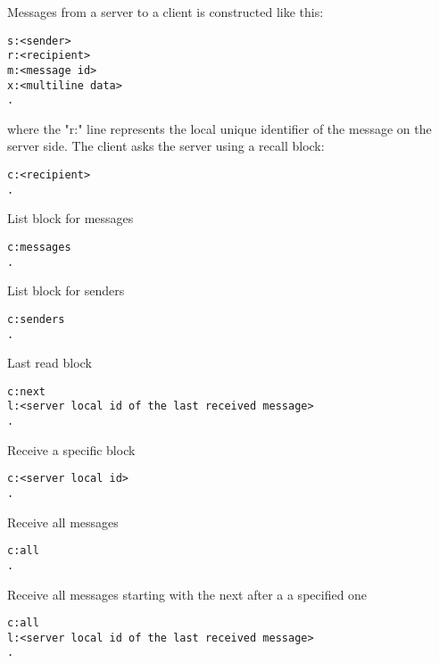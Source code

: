 \documentclass[twoside,a4paper,english,12pt,authoryear,openright]{book}
\begin{document}
Messages from a server to a client is constructed like this:

\begin{lstlisting}
s:<sender>
r:<recipient>
m:<message id>
x:<multiline data>
.
\end{lstlisting}

where the "r:" line represents the local unique identifier of the message on the server side. The client asks the server using a recall block:

\begin{lstlisting}
c:<recipient>
.
\end{lstlisting}

List block for messages

\begin{lstlisting}
c:messages
.
\end{lstlisting}

List block for senders

\begin{lstlisting}
c:senders
.
\end{lstlisting}

Last read block

\begin{lstlisting}
c:next
l:<server local id of the last received message>
.
\end{lstlisting}

Receive a specific block

\begin{lstlisting}
c:<server local id>
.
\end{lstlisting}

Receive all messages

\begin{lstlisting}
c:all
.
\end{lstlisting}

Receive all messages starting with the next after a a specified one

\begin{lstlisting}
c:all
l:<server local id of the last received message>
.
\end{lstlisting}


\backmatter 
 

% 

\end{document}
